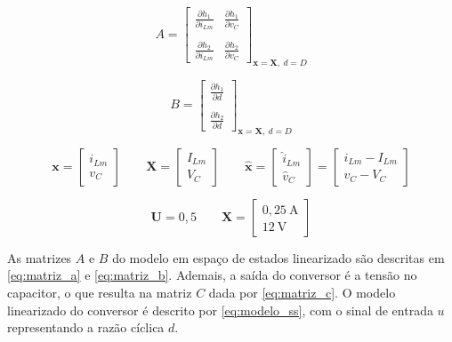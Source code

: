 \documentclass{article}
\begin{document}
\begin{equation}A =
  \begin{bmatrix}
    \frac{\partial h_1}{\partial i_{Lm}} & \frac{\partial h_1}{\partial v_{C}} \\ \\
    \frac{\partial h_2}{\partial i_{Lm}} & \frac{\partial h_2}{\partial v_{C}}
  \end{bmatrix}_{\mathbf{x} = \mathbf{X},\ d = D}
  \label{eq:jacobiano_estados}
\end{equation}

\begin{equation}
  B =
  \begin{bmatrix}
    \frac{\partial h_1}{\partial d} \\ \\
    \frac{\partial h_2}{\partial d}
  \end{bmatrix}_{\mathbf{x} = \mathbf{X},\ d = D}
  \label{eq:jacobiano_saida}
\end{equation}



\begin{equation}
  \mathbf{x} = \begin{bmatrix}
    i_{Lm} \\
    v_C
  \end{bmatrix}
  \qquad   \mathbf{X} = \begin{bmatrix}
    I_{Lm} \\
    V_C
  \end{bmatrix}
  \qquad \mathbf{\hat{x}} = \begin{bmatrix}
    \hat{i}_{Lm} \\
    \hat{v}_C
  \end{bmatrix} =  \begin{bmatrix}
    i_{Lm} - I_{Lm} \\
    v_C - V_C
  \end{bmatrix}
  \label{eq:vetor_estados} 
\end{equation}

\begin{equation}
  \mathbf{U} = 0,5 \qquad \mathbf{X} =
  \begin{bmatrix}
    0,25\ \mathrm{A} \\
    12 \ \mathrm{V}
  \end{bmatrix}
  \label{eq:ponto_equilibrio}
\end{equation}

As matrizes \(A\) e \(B\) do modelo em espaço de estados linearizado são descritas em \eqref{eq:matriz_a} e \eqref{eq:matriz_b}. Ademais, a saída do conversor é a tensão no capacitor, o que resulta na matriz \(C\) dada por \eqref{eq:matriz_c}. O modelo linearizado do conversor é descrito por \eqref{eq:modelo_ss}, com o sinal de entrada \(u\) representando a razão cíclica \(d\).
\end{document}
